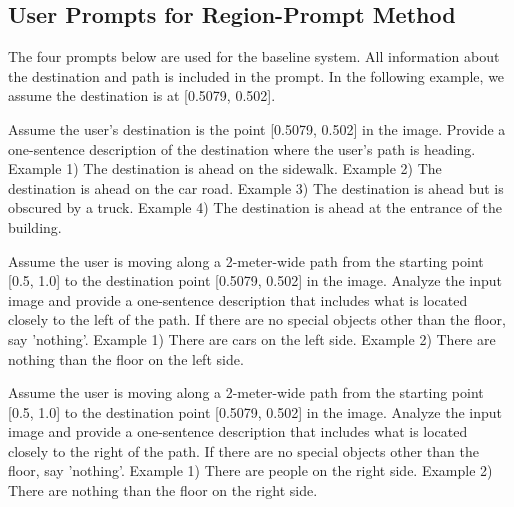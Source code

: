 \subsection{User Prompts for Region-Prompt Method}
The four prompts below are used for the baseline system. All information about the destination and path is included in the prompt. In the following example, we assume the destination is at [0.5079, 0.502].

\begin{tcolorbox}[
colback=red!10!white, 
colframe=red!50!black, 
rounded corners, 
boxrule=0.5mm, 
title=User prompt for destination description,
width=\columnwidth]
Assume the user's destination is the point [0.5079, 0.502] in the image. Provide a one-sentence description of the destination where the user's path is heading. Example 1) The destination is ahead on the sidewalk. Example 2) The destination is ahead on the car road. Example 3) The destination is ahead but is obscured by a truck. Example 4) The destination is ahead at the entrance of the building. 
\end{tcolorbox}

\begin{tcolorbox}[
colback=red!10!white, 
colframe=red!50!black, 
rounded corners, 
boxrule=0.5mm, 
title=User prompt for left description,
width=\columnwidth]
Assume the user is moving along a 2-meter-wide path from the starting point [0.5, 1.0] to the destination point [0.5079, 0.502] in the image. Analyze the input image and provide a one-sentence description that includes what is located closely to the left of the path. If there are no special objects other than the floor, say 'nothing'. Example 1) There are cars on the left side. Example 2) There are nothing than the floor on the left side.
\end{tcolorbox}

\begin{tcolorbox}[
colback=red!10!white, 
colframe=red!50!black, 
rounded corners, 
boxrule=0.5mm, 
title=User prompt for right description,
width=\columnwidth]
Assume the user is moving along a 2-meter-wide path from the starting point [0.5, 1.0] to the destination point [0.5079, 0.502] in the image. Analyze the input image and provide a one-sentence description that includes what is located closely to the right of the path. If there are no special objects other than the floor, say 'nothing'. Example 1) There are people on the right side. Example 2) There are nothing than the floor on the right side. 
\end{tcolorbox}

